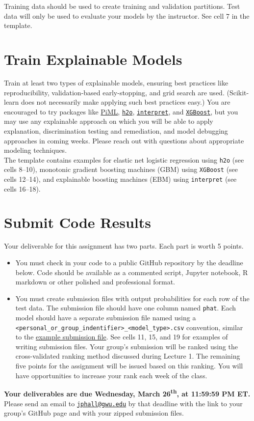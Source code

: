 \documentclass[fleqn]{article}
\begin{document}
\noindent Training data should be used to create training and validation partitions. Test data will only be used to evaluate your models by the instructor. See cell 7 in the template.

\section{Train Explainable Models}

Train at least two types of explainable models, ensuring best practices like reproducibility, validation-based early-stopping, and grid search are used. (Scikit-learn does not necessarily make applying such best practices easy.) You are encouraged to try packages like \href{https://selfexplainml.github.io/PiML-Toolbox/_build/html/index.html}{PiML}, \href{https://docs.h2o.ai/h2o/latest-stable/h2o-docs/downloading.html}{\texttt{h2o}}, \href{https://github.com/interpretml/interpret}{\texttt{interpret}}, and \href{https://xgboost.readthedocs.io/en/latest/install.html}{\texttt{XGBoost}}, but you may use any explainable approach on which you will be able to apply explanation, discrimination testing and remediation, and model debugging approaches in coming weeks. Please reach out with questions about appropriate modeling techniques.\\

\noindent The template contains examples for elastic net logistic regression using \texttt{h2o} (see cells 8--10), monotonic gradient boosting machines (GBM) using \texttt{XGBoost} (see cells 12--14), and explainable boosting machines (EBM) using \texttt{interpret} (see cells 16--18). 

\section{Submit Code Results}

Your deliverable for this assignment has two parts. Each part is worth 5 points. 

\begin{itemize}
	\item You must check in your code to a public GitHub repository by the deadline below. Code should be available as a commented script, Jupyter notebook, R markdown or other polished and professional format. 
	\item You must create submission files with output probabilities for each row of the test data. The submission file should have one column named \texttt{phat}. Each model should have a separate submission file named using a \texttt{<personal\_or\_group\_indentifier>\_<model\_type>.csv} convention, similar to the \href{https://github.com/jphall663/GWU_rml/blob/master/assignments/assignment_1/ph_glm.csv}{example submission file}. See cells 11, 15, and 19 for examples of writing submission files. Your group's submission will be ranked using the cross-validated ranking method discussed during Lecture 1. The remaining five points for the assignment will be issued based on this ranking. You will have opportunities to increase your rank each week of the class. 
\end{itemize}

\noindent \textbf{Your deliverables are due Wednesday, March 26\textsuperscript{th}, at 11:59:59 PM ET.}\\

\noindent Please send an email to \href{mailto:jphall@gwu.edu}{\texttt{jphall@gwu.edu}} by that deadline with the link to your group's GitHub page and with your zipped submission files. 
\end{document}
